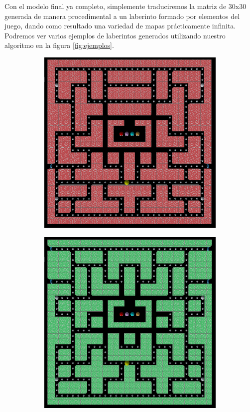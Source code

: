 Con el modelo final ya completo, simplemente traduciremos la matriz de 30x30 generada de manera procedimental a un laberinto formado por elementos del juego, dando como resultado una variedad de mapas prácticamente infinita. Podremos ver varios ejemplos de laberintos generados utilizando nuestro algoritmo en la figura \ref{fig:ejemplos}.\\

     \begin{figure}[H]
    \centering
        \begin{subfigure}[b]{0.48\textwidth}
            \includegraphics[scale=0.18]{img/laberinto1.png}
        \end{subfigure}
        \hfill
        \begin{subfigure}[b]{0.48\textwidth}
            \includegraphics[scale=0.18]{img/laberinto2.png}

\end{subfigure}
\end{figure}
